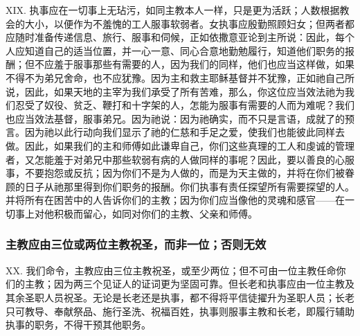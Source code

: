 XIX. 执事应在一切事上无玷污，如同主教本人一样，只是更为活跃；人数根据教会的大小，以便作为不羞愧的工人服事软弱者。女执事应殷勤照顾妇女；但两者都应随时准备传递信息、旅行、服事和伺候，正如依撒意亚论到主所说：因此，每个人应知道自己的适当位置，并一心一意、同心合意地勤勉履行，知道他们职务的报酬；但不应羞于服事那些有需要的人，因为我们的同样，他们也应当这样做，如果不得不为弟兄舍命，也不应犹豫。因为主和救主耶稣基督并不犹豫，正如祂自己所说，因此，如果天地的主宰为我们承受了所有苦难，那么，你这位应当效法祂为我们忍受了奴役、贫乏、鞭打和十字架的人，怎能为服事有需要的人而为难呢？我们也应当效法基督，服事弟兄。因为祂说：因为祂确实，而不只是言语，成就了的预言。因为祂以此行动向我们显示了祂的仁慈和手足之爱，使我们也能彼此同样去做。因此，如果我们的主和师傅如此谦卑自己，你们这些真理的工人和虔诚的管理者，又怎能羞于对弟兄中那些软弱有病的人做同样的事呢？因此，要以善良的心服事，不要抱怨或反抗；因为你们不是为人做的，而是为天主做的，并将在你们被眷顾的日子从祂那里得到你们职务的报酬。你们执事有责任探望所有需要探望的人。并将所有在困苦中的人告诉你们的主教；因为你们应当像他的灵魂和感官——在一切事上对他积极而留心，如同对你们的主教、父亲和师傅。\par


\subsubsection{主教应由三位或两位主教祝圣，而非一位；否则无效}

XX. 我们命令，主教应由三位主教祝圣，或至少两位；但不可由一位主教任命你们的主教；因为两三个见证人的证词更为坚固可靠。但长老和执事应由一位主教及其余圣职人员祝圣。无论是长老还是执事，都不得将平信徒擢升为圣职人员；长老只可教导、奉献祭品、施行圣洗、祝福百姓，执事则服事主教和长老，即履行辅助执事的职务，不得干预其他职务。\par


